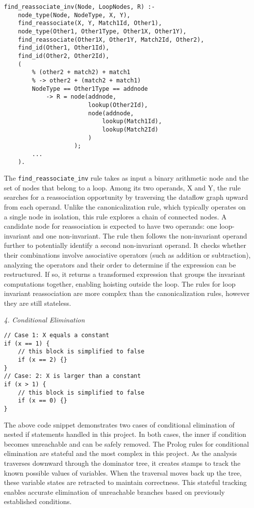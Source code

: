 \begin{lstlisting}
find_reassociate_inv(Node, LoopNodes, R) :-
    node_type(Node, NodeType, X, Y),
    find_reassociate(X, Y, Match1Id, Other1),
    node_type(Other1, Other1Type, Other1X, Other1Y),
    find_reassociate(Other1X, Other1Y, Match2Id, Other2),
    find_id(Other1, Other1Id),
    find_id(Other2, Other2Id),
    (
        % (other2 + match2) + match1 
        % -> other2 + (match2 + match1)
        NodeType == Other1Type == addnode
            -> R = node(addnode, 
                        lookup(Other2Id), 
                        node(addnode, 
                            lookup(Match1Id), 
                            lookup(Match2Id)
                        )
                    );
        ...
    ).
\end{lstlisting}
The \texttt{find_reassociate_inv} rule takes as input a binary arithmetic node and the set of nodes that belong to a loop. Among its two operands, X and Y, the rule searches for a reassociation opportunity by traversing the dataflow graph upward from each operand. Unlike the canonicalization rule, which typically operates on a single node in isolation, this rule explores a chain of connected nodes. A candidate node for reassociation is expected to have two operands: one loop-invariant and one non-invariant. The rule then follows the non-invariant operand further to potentially identify a second non-invariant operand. It checks whether their combinations involve associative operators (such as addition or subtraction), analyzing the operators and their order to determine if the expression can be restructured. If so, it returns a transformed expression that groups the invariant computations together, enabling hoisting outside the loop.
The rules for loop invariant reassociation are more complex than the canonicalization rules, however they are still stateless.

\bigbreak
\textit{4. Conditional Elimination}
\smallbreak

\begin{lstlisting}
// Case 1: X equals a constant
if (x == 1) {
    // this block is simplified to false
    if (x == 2) {}
}
// Case: 2: X is larger than a constant
if (x > 1) {
    // this block is simplified to false
    if (x == 0) {}
}
\end{lstlisting}

The above code snippet demonstrates two cases of conditional elimination of nested if statements handled in this project. In both cases, the inner if condition becomes unreachable and can be safely removed.
The Prolog rules for conditional elimination are stateful and the most complex in this project. As the analysis traverses downward through the dominator tree, it creates stamps to track the known possible values of variables. When the traversal moves back up the tree, these variable states are retracted to maintain correctness. This stateful tracking enables accurate elimination of unreachable branches based on previously established conditions.

